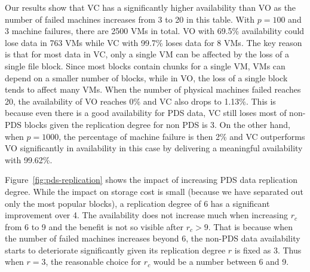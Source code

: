 Our results show that VC has a significantly  higher availability than VO as the number of
failed machines increases from 3 to 20
in this table.
With $p=100$ and 3 machine failures,
there are 2500 VMs in total. VO with 69.5\% availability could lose data in 763 VMs 
while VC with 99.7\% loses data for 8 VMs.
The key reason is that for most data in VC, only a single VM can be affected by
the loss of a single file block. Since most blocks contain chunks for a single
VM, VMs can depend on a smaller number of blocks, while in VO, the loss of a
single block tends to affect many VMs.
When the number of physical machines failed reaches 20, the availability of VO reaches 0\%
and VC also drops to 1.13\%. This is because even there is a good availability for PDS data, VC still
loses most of non-PDS blocks given the replication degree for non PDS is 3.
On the other hand, when $p=1000$, the percentage of machine failure is then 2\% and
 VC outperforms VO significantly in availability in this case by delivering a meaningful availability with 99.62\%.



%
Figure~\ref{fig:pds-replication} shows
the impact of increasing PDS data replication degree. 
While the impact on storage cost is small (because we have separated out only
the most popular blocks),
a replication degree of 6  has a significant improvement over 4. The
availability does not increase much  when increasing
$r_c$ from 6 to 9 and the benefit is not so visible after $r_c>9$. 
That is because when the number of failed machines increases beyond 6, 
the non-PDS data availability starts to deteriorate significantly given its replication degree
$r$ is fixed as 3. Thus when $r=3$, the reasonable choice for $r_c$ would be a number between 6 and 9.
 
